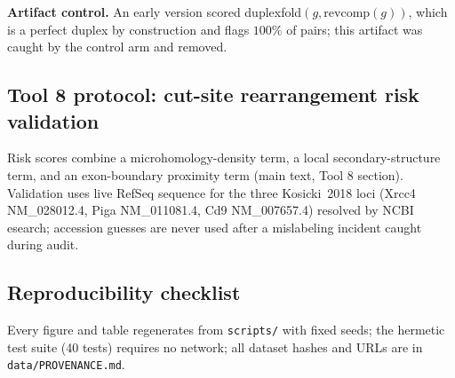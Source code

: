 \textbf{Artifact control.} An early version scored duplexfold$(g,
\mathrm{revcomp}(g))$, which is a perfect duplex by construction and flags
$100\%$ of pairs; this artifact was caught by the control arm and removed.

\subsection{Tool 8 protocol: cut-site rearrangement risk validation}
Risk scores combine a microhomology-density term, a local secondary-structure
term, and an exon-boundary proximity term (main text, Tool 8 section).
Validation uses live RefSeq sequence for the three Kosicki~2018 loci
(Xrcc4 NM\_028012.4, Piga NM\_011081.4, Cd9 NM\_007657.4) resolved by
NCBI esearch; accession guesses are never used after a mislabeling incident
caught during audit.

\subsection{Reproducibility checklist}
Every figure and table regenerates from \texttt{scripts/} with fixed seeds;
the hermetic test suite (40 tests) requires no network; all dataset hashes
and URLs are in \texttt{data/PROVENANCE.md}.
